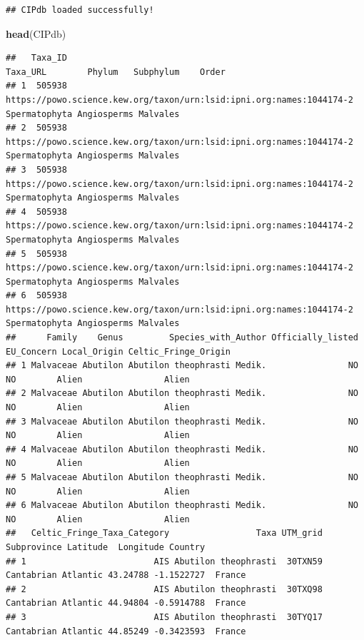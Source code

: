 \documentclass[
]{article}
\newenvironment{Shaded}{\begin{snugshade}}{\end{snugshade}}
\newcommand{\FunctionTok}[1]{\textcolor[rgb]{0.13,0.29,0.53}{\textbf{#1}}}
\newcommand{\NormalTok}[1]{#1}
\begin{document}
\begin{verbatim}
## CIPdb loaded successfully!
\end{verbatim}

\begin{Shaded}
\begin{Highlighting}[]
\FunctionTok{head}\NormalTok{(CIPdb)}
\end{Highlighting}
\end{Shaded}

\begin{verbatim}
##   Taxa_ID                                                             Taxa_URL        Phylum   Subphylum    Order
## 1  505938 https://powo.science.kew.org/taxon/urn:lsid:ipni.org:names:1044174-2 Spermatophyta Angiosperms Malvales
## 2  505938 https://powo.science.kew.org/taxon/urn:lsid:ipni.org:names:1044174-2 Spermatophyta Angiosperms Malvales
## 3  505938 https://powo.science.kew.org/taxon/urn:lsid:ipni.org:names:1044174-2 Spermatophyta Angiosperms Malvales
## 4  505938 https://powo.science.kew.org/taxon/urn:lsid:ipni.org:names:1044174-2 Spermatophyta Angiosperms Malvales
## 5  505938 https://powo.science.kew.org/taxon/urn:lsid:ipni.org:names:1044174-2 Spermatophyta Angiosperms Malvales
## 6  505938 https://powo.science.kew.org/taxon/urn:lsid:ipni.org:names:1044174-2 Spermatophyta Angiosperms Malvales
##      Family    Genus         Species_with_Author Officially_listed EU_Concern Local_Origin Celtic_Fringe_Origin
## 1 Malvaceae Abutilon Abutilon theophrasti Medik.                NO         NO        Alien                Alien
## 2 Malvaceae Abutilon Abutilon theophrasti Medik.                NO         NO        Alien                Alien
## 3 Malvaceae Abutilon Abutilon theophrasti Medik.                NO         NO        Alien                Alien
## 4 Malvaceae Abutilon Abutilon theophrasti Medik.                NO         NO        Alien                Alien
## 5 Malvaceae Abutilon Abutilon theophrasti Medik.                NO         NO        Alien                Alien
## 6 Malvaceae Abutilon Abutilon theophrasti Medik.                NO         NO        Alien                Alien
##   Celtic_Fringe_Taxa_Category                 Taxa UTM_grid         Subprovince Latitude  Longitude Country
## 1                         AIS Abutilon theophrasti  30TXN59 Cantabrian Atlantic 43.24788 -1.1522727  France
## 2                         AIS Abutilon theophrasti  30TXQ98 Cantabrian Atlantic 44.94804 -0.5914788  France
## 3                         AIS Abutilon theophrasti  30TYQ17 Cantabrian Atlantic 44.85249 -0.3423593  France

\end{verbatim}
\end{document}
